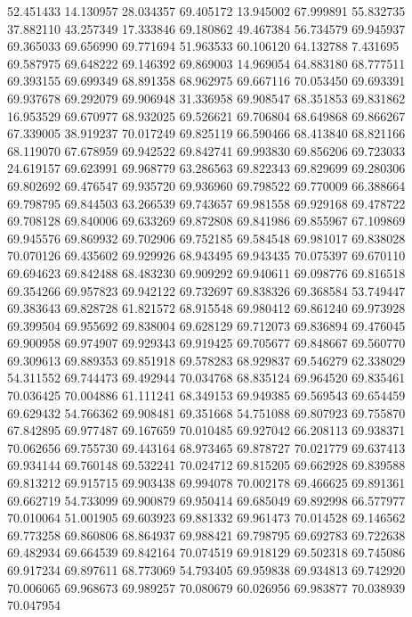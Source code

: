 52.451433
14.130957
28.034357
69.405172
13.945002
67.999891
55.832735
37.882110
43.257349
17.333846
69.180862
49.467384
56.734579
69.945937
69.365033
69.656990
69.771694
51.963533
60.106120
64.132788
7.431695
69.587975
69.648222
69.146392
69.869003
14.969054
64.883180
68.777511
69.393155
69.699349
68.891358
68.962975
69.667116
70.053450
69.693391
69.937678
69.292079
69.906948
31.336958
69.908547
68.351853
69.831862
16.953529
69.670977
68.932025
69.526621
69.706804
68.649868
69.866267
67.339005
38.919237
70.017249
69.825119
66.590466
68.413840
68.821166
68.119070
67.678959
69.942522
69.842741
69.993830
69.856206
69.723033
24.619157
69.623991
69.968779
63.286563
69.822343
69.829699
69.280306
69.802692
69.476547
69.935720
69.936960
69.798522
69.770009
66.388664
69.798795
69.844503
63.266539
69.743657
69.981558
69.929168
69.478722
69.708128
69.840006
69.633269
69.872808
69.841986
69.855967
67.109869
69.945576
69.869932
69.702906
69.752185
69.584548
69.981017
69.838028
70.070126
69.435602
69.929926
68.943495
69.943435
70.075397
69.670110
69.694623
69.842488
68.483230
69.909292
69.940611
69.098776
69.816518
69.354266
69.957823
69.942122
69.732697
69.838326
69.368584
53.749447
69.383643
69.828728
61.821572
68.915548
69.980412
69.861240
69.973928
69.399504
69.955692
69.838004
69.628129
69.712073
69.836894
69.476045
69.900958
69.974907
69.929343
69.919425
69.705677
69.848667
69.560770
69.309613
69.889353
69.851918
69.578283
68.929837
69.546279
62.338029
54.311552
69.744473
69.492944
70.034768
68.835124
69.964520
69.835461
70.036425
70.004886
61.111241
68.349153
69.949385
69.569543
69.654459
69.629432
54.766362
69.908481
69.351668
54.751088
69.807923
69.755870
67.842895
69.977487
69.167659
70.010485
69.927042
66.208113
69.938371
70.062656
69.755730
69.443164
68.973465
69.878727
70.021779
69.637413
69.934144
69.760148
69.532241
70.024712
69.815205
69.662928
69.839588
69.813212
69.915715
69.903438
69.994078
70.002178
69.466625
69.891361
69.662719
54.733099
69.900879
69.950414
69.685049
69.892998
66.577977
70.010064
51.001905
69.603923
69.881332
69.961473
70.014528
69.146562
69.773258
69.860806
68.864937
69.988421
69.798795
69.692783
69.722638
69.482934
69.664539
69.842164
70.074519
69.918129
69.502318
69.745086
69.917234
69.897611
68.773069
54.793405
69.959838
69.934813
69.742920
70.006065
69.968673
69.989257
70.080679
60.026956
69.983877
70.038939
70.047954
